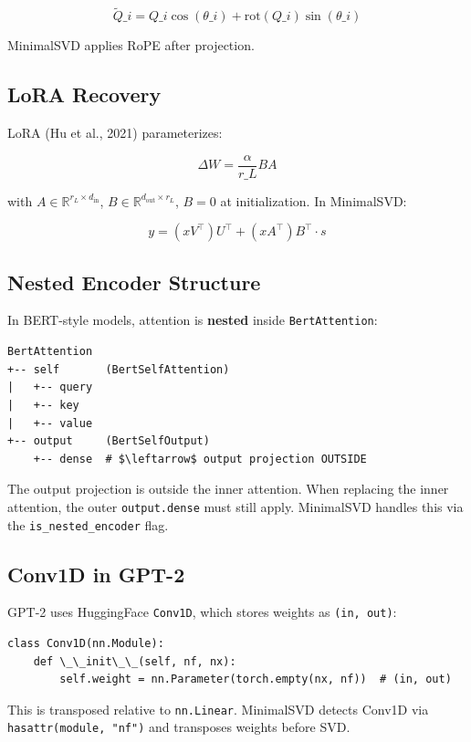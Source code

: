 \[
\tilde{Q}\_i = Q\_i \cos(\theta\_i) + \text{rot}(Q\_i) \sin(\theta\_i)
\tag{3.9}
\]

MinimalSVD applies RoPE after projection.

\subsection{LoRA Recovery}

LoRA (Hu et al., 2021) parameterizes:

\[
\Delta W = \frac{\alpha}{r\_L} B A
\tag{3.10}
\]

with $A \in \mathbb{R}^{r_L \times d_\text{in}}$, $B \in \mathbb{R}^{d_\text{out} \times r_L}$, 
$B = 0$ at initialization. In MinimalSVD:

\[
y = (x V^\top) U^\top + (x A^\top) B^\top \cdot s
\tag{3.11}
\]

\subsection{Nested Encoder Structure}

In BERT-style models, attention is \textbf{nested} inside \texttt{BertAttention}:

\begin{lstlisting}
BertAttention
+-- self       (BertSelfAttention)
|   +-- query
|   +-- key
|   +-- value
+-- output     (BertSelfOutput)
    +-- dense  # $\leftarrow$ output projection OUTSIDE
\end{lstlisting}

The output projection is outside the inner attention. When replacing the 
inner attention, the outer \texttt{output.dense} must still apply. MinimalSVD 
handles this via the \texttt{is\_nested\_encoder} flag.

\subsection{Conv1D in GPT-2}

GPT-2 uses HuggingFace \texttt{Conv1D}, which stores weights as \texttt{(in, out)}:

\begin{lstlisting}
class Conv1D(nn.Module):
    def \_\_init\_\_(self, nf, nx):
        self.weight = nn.Parameter(torch.empty(nx, nf))  # (in, out)
\end{lstlisting}

This is transposed relative to \texttt{nn.Linear}. MinimalSVD detects Conv1D via 
\texttt{hasattr(module, "nf")} and transposes weights before SVD.

